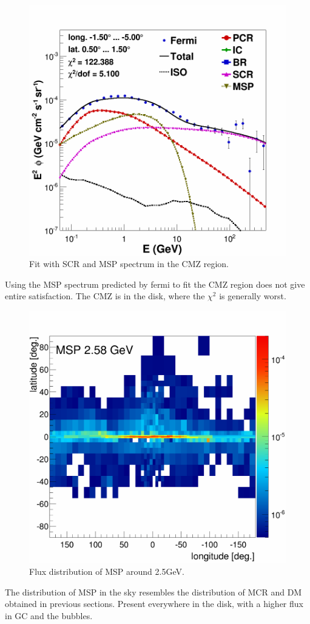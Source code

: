 \begin{figure}[h]
  \centering
  \includegraphics[width=.5\linewidth]{pic/results/MSPonly_CMZ.png}
  \caption{Fit with SCR and MSP spectrum in the CMZ region.}
  \label{fig:MSP_only_CMZ}
\end{figure}


Using the MSP spectrum predicted by fermi   to fit the CMZ region does not give entire satisfaction. The CMZ is in the disk, where the $\chi^2$ is generally worst.



\begin{figure}[h]
  \centering
  \includegraphics[width=.5\linewidth]{pic/results/MSPonly_MSP_fluxE12_skymap.png}
  \caption{Flux distribution of MSP around 2.5GeV.}
  \label{fig:MSP_only_CMZ}
\end{figure}

The distribution of MSP in the sky resembles the distribution of MCR and DM obtained in previous sections. Present everywhere in the disk, with a higher flux in GC and the bubbles.





















